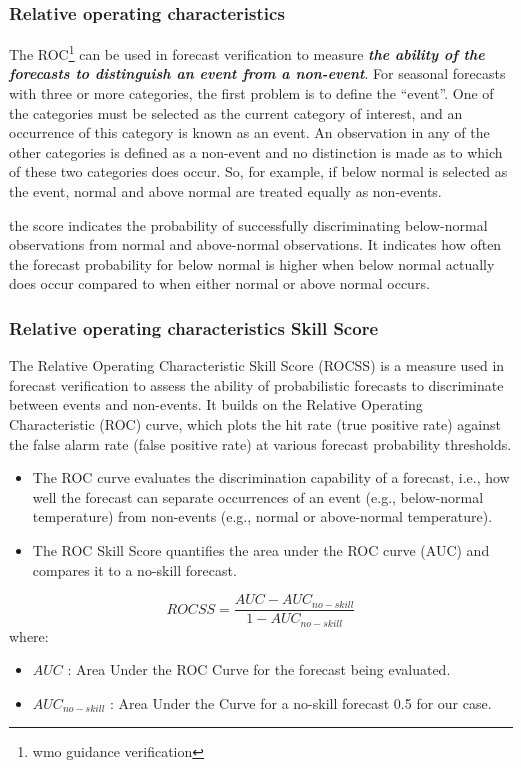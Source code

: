 \subsubsection{Relative operating characteristics}
The ROC\footnote{wmo guidance verification} can be used in forecast verification to measure \textbf{\textit{the ability of the forecasts to distinguish an event from a non-event}}. For seasonal forecasts with three or more categories, the first
problem is to define the “event”. One of the categories must be selected as the current category
of interest, and an occurrence of this category is known as an event. An observation in any of
the other categories is defined as a non-event and no distinction is made as to which of these
two categories does occur. So, for example, if below normal is selected as the event, normal
and above normal are treated equally as non-events.

the score indicates the probability of successfully
discriminating below-normal observations from normal and above-normal observations. It
indicates how often the forecast probability for below normal is higher when below normal
actually does occur compared to when either normal or above normal occurs.



\subsubsection{Relative operating characteristics Skill Score}
The Relative Operating Characteristic Skill Score (ROCSS) is a measure used in forecast verification to assess the ability of probabilistic forecasts to discriminate between events and non-events. It builds on the Relative Operating Characteristic (ROC) curve, which plots the hit rate (true positive rate) against the false alarm rate (false positive rate) at various forecast probability thresholds.

\begin{itemize}
	\item The ROC curve evaluates the discrimination capability of a forecast, i.e., how well the forecast can separate occurrences of an event (e.g., below-normal temperature) from non-events (e.g., normal or above-normal temperature).
	\item The ROC Skill Score quantifies the area under the ROC curve (AUC) and compares it to a no-skill forecast.
\end{itemize}

	$$ROCSS=\frac{AUC-AUC_{no-skill}}{1-AUC_{no-skill}}$$
where:
\begin{itemize}
	\item $AUC$ : Area Under the ROC Curve for the forecast being evaluated.
	\item $AUC_{no-skill}$ : Area Under the Curve for a no-skill forecast 0.5 for our case.
\end{itemize}

